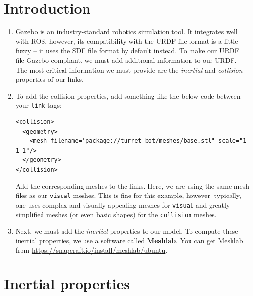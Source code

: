 \documentclass{article}
\begin{document}
    \section{Introduction}
        \begin{enumerate}
            \item Gazebo is an industry-standard robotics simulation tool. It integrates well with ROS, however, its compatibility with 
            the URDF file format is a little fuzzy -- it uses the SDF file format by default instead. To 
            make our URDF file Gazebo-compliant, we must add additional information to our URDF. The 
            most critical information we must provide are the \emph{inertial} and \emph{collision} properties 
            of our links.

            \item To add the collision properties, add something like the below code between
            your \texttt{link} tags:
            \begin{verbatim}
<collision>
  <geometry>
    <mesh filename="package://turret_bot/meshes/base.stl" scale="1 1 1"/>
  </geometry> 
</collision>
            \end{verbatim}
            Add the corresponding meshes to the links. Here, we are using the same mesh files as
            our \texttt{visual} meshes. This is fine for this example, however, typically, one uses 
            complex and visually appealing meshes for \texttt{visual} and greatly simplified meshes 
            (or even basic shapes) for the \texttt{collision} meshes.
            \item Next, we must add the \emph{inertial} properties to our model. To compute these 
            inertial properties, we use a software called \textbf{Meshlab}. You can get Meshlab from 
            \url{https://snapcraft.io/install/meshlab/ubuntu}.
        \end{enumerate}
    \section{Inertial properties}
\end{document}
